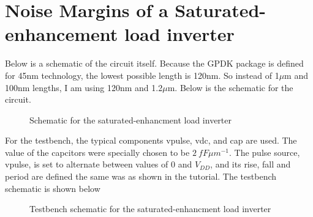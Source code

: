 \documentclass[12pt]{article}
\begin{document}
\section{Noise Margins of a Saturated-enhancement load inverter}
Below is a schematic of the circuit itself. Because the GPDK package is defined for 45nm technology, the lowest possible length is 120nm.
So instead of 1$\mu$m and 100nm lengths, I am using 120nm and 1.2$\mu$m. Below is the schematic for the circuit.
\begin{figure} [H]
    \centering
    \caption{Schematic for the saturated-enhancment load inverter}
\end{figure}
For the testbench, the typical components vpulse, vdc, and cap are used. The value of the capcitors were
specially chosen to be $\SI{2}{fF \mu m^{-1}}$. The pulse source, vpulse, is set to alternate between values of 0 and $V_{DD}$, and its 
rise, fall and period are defined the same was as shown in the tutorial.
The testbench schematic is shown below
\begin{figure} [H]
    \centering
    \caption{Testbench schematic for the saturated-enhancment load inverter}
\end{figure}
\end{document}
